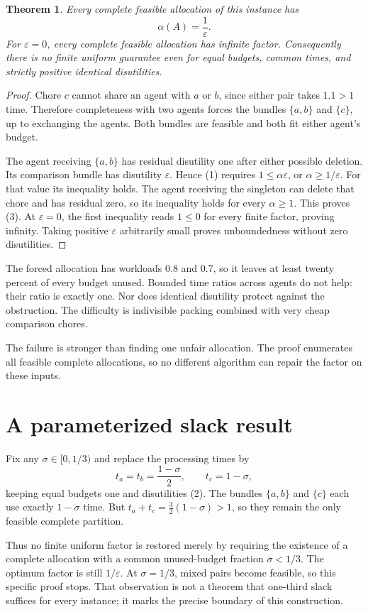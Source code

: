 \documentclass[11pt,a4paper]{article}
\newtheorem{theorem}{Theorem}[section]
\begin{document}
\begin{theorem}
Every complete feasible allocation of this instance has
\[
 \alpha(A)=\frac1{\varepsilon}.
 \tag{3}
\]
For $\varepsilon=0$, every complete feasible allocation has infinite factor. Consequently there is no finite uniform guarantee even for equal budgets, common times, and strictly positive identical disutilities.
\end{theorem}
\begin{proof}
Chore $c$ cannot share an agent with $a$ or $b$, since either pair takes $1.1>1$ time. Therefore completeness with two agents forces the bundles $\{a,b\}$ and $\{c\}$, up to exchanging the agents. Both bundles are feasible and both fit either agent's budget.

The agent receiving $\{a,b\}$ has residual disutility one after either possible deletion. Its comparison bundle has disutility $\varepsilon$. Hence (1) requires $1\le\alpha\varepsilon$, or $\alpha\ge1/\varepsilon$. For that value its inequality holds. The agent receiving the singleton can delete that chore and has residual zero, so its inequality holds for every $\alpha\ge1$. This proves (3). At $\varepsilon=0$, the first inequality reads $1\le0$ for every finite factor, proving infinity. Taking positive $\varepsilon$ arbitrarily small proves unboundedness without zero disutilities.
\end{proof}
The forced allocation has workloads $0.8$ and $0.7$, so it leaves at least twenty percent of every budget unused. Bounded time ratios across agents do not help: their ratio is exactly one. Nor does identical disutility protect against the obstruction. The difficulty is indivisible packing combined with very cheap comparison chores.

The failure is stronger than finding one unfair allocation. The proof enumerates all feasible complete allocations, so no different algorithm can repair the factor on these inputs.
\section{A parameterized slack result}
Fix any $\sigma\in[0,1/3)$ and replace the processing times by
\[
 t_a=t_b=\frac{1-\sigma}{2},\qquad t_c=1-\sigma,
 \tag{4}
\]
keeping equal budgets one and disutilities (2). The bundles $\{a,b\}$ and $\{c\}$ each use exactly $1-\sigma$ time. But
$t_a+t_c=\tfrac32(1-\sigma)>1$, so they remain the only feasible complete partition.

Thus no finite uniform factor is restored merely by requiring the existence of a complete allocation with a common unused-budget fraction $\sigma<1/3$. The optimum factor is still $1/\varepsilon$. At $\sigma=1/3$, mixed pairs become feasible, so this specific proof stops. That observation is not a theorem that one-third slack suffices for every instance; it marks the precise boundary of this construction.
\end{document}
